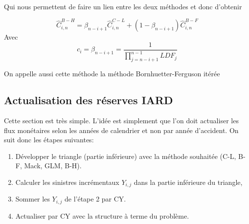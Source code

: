 \documentclass[11pt,french]{report}
\begin{document}
Qui nous permettent de faire un lien entre les deux méthodes et donc d'obtenir

$$\boxed{\widehat{C}_{i,n}^{B-H}=\beta_{n-i+1} \widehat{C}_{i,n}^{C-L} + (1-\beta_{n-i+1}) \widehat{C}_{i,n}^{B-F}}$$
Avec
$$\boxed{c_i = \beta_{n-i+1}= \frac{1}{\prod_{j=n-i+1}^{n-1} LDF_j}}$$

On appelle aussi cette méthode la méthode Bornhuetter-Ferguson itérée

\subsection*{Actualisation des réserves IARD}

Cette section est très simple. L'idée est simplement que l'on doit actualiser les flux monétaires selon les années de calendrier et non par année d'accident. On suit donc les étapes suivantes:

\begin{enumerate}
\item Développer le triangle (partie inférieure) avec la méthode souhaitée (C-L, B-F, Mack, GLM, B-H).
\item Calculer les sinistres incrémentaux $Y_{i,j}$ dans la partie inférieure du triangle,
\item Sommer les $Y_{i,j}$ de l'étape 2 par CY.
\item Actualiser par CY avec la structure à terme du problème.
\end{enumerate}
\end{document}
